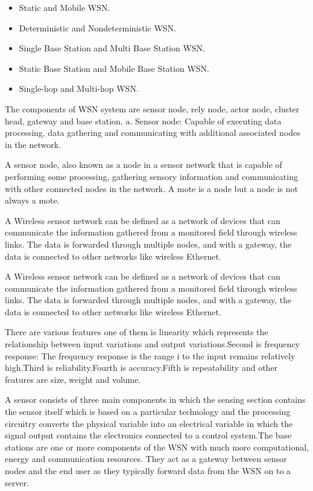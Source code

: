 \begin{itemize}
\item Static and Mobile WSN.
\item Deterministic and Nondeterministic WSN.
\item Single Base Station and Multi Base Station WSN.
\item Static Base Station and Mobile Base Station WSN.
\item Single-hop and Multi-hop WSN.
\end{itemize}


The components of WSN system are sensor node, rely node, actor node, cluster head, gateway and base station. a. Sensor node: Capable of executing data processing, data gathering and communicating with additional associated nodes in the network.


A sensor node, also known as a node in a sensor network that is capable of performing some processing, gathering sensory information and communicating with other connected nodes in the network. A mote is a node but a node is not always a mote.


A Wireless sensor network can be defined as a network of devices that can communicate the information gathered from a monitored field through wireless links\cite{11}. The data is forwarded through multiple nodes, and with a gateway, the data is connected to other networks like wireless Ethernet.


A Wireless sensor network can be defined as a network of devices that can communicate the information gathered from a monitored field through wireless links. The data is forwarded through multiple nodes, and with a gateway, the data is connected to other networks like wireless Ethernet.


There are various features one of them is linearity which represents the relationship between input variations and output variations.Second is frequency response: The frequency response is the range i to the input remains relatively high.Third is reliability.Fourth is accuracy.Fifth is repeatability and other features are size, weight and volume.


A sensor consists of three main components in which the sensing section contains the sensor itself which is based on a particular technology and the processing circuitry converts the physical variable into an electrical variable in which the signal output contains the electronics connected to a control system.The base stations are one or more components of the WSN with much more computational, energy and communication resources. They act as a gateway between sensor nodes and the end user as they typically forward data from the WSN on to a server.


